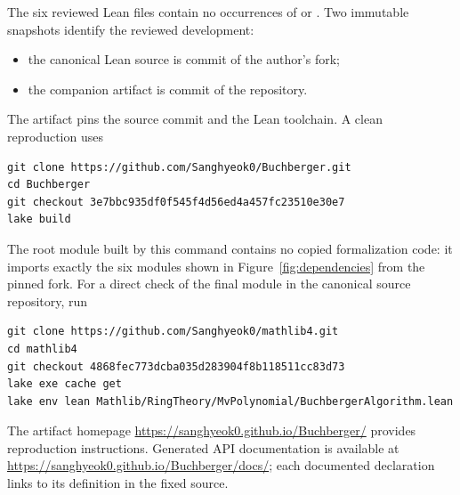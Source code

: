 The six reviewed Lean files contain no occurrences of  or
.  Two immutable snapshots identify the reviewed development:
\begin{itemize}[leftmargin=2em]
  \item the canonical Lean source is commit
    \href{https://github.com/Sanghyeok0/mathlib4/tree/4868fec773dcba035d283904f8b118511cc83d73}
    {}
    of the author's  fork;
  \item the companion artifact is commit
    \href{https://github.com/Sanghyeok0/Buchberger/commit/3e7bbc935df0f545f4d56ed4a457fc23510e30e7}
    {}
    of the  repository.
\end{itemize}
The artifact pins the source commit and the Lean
 toolchain.  A clean reproduction uses
\begin{verbatim}
git clone https://github.com/Sanghyeok0/Buchberger.git
cd Buchberger
git checkout 3e7bbc935df0f545f4d56ed4a457fc23510e30e7
lake build
\end{verbatim}
The root module built by this command contains no copied formalization
code: it imports exactly the six modules shown in
Figure~\ref{fig:dependencies} from the pinned fork.  For a direct check of the
final module in the canonical source repository, run
\begin{verbatim}
git clone https://github.com/Sanghyeok0/mathlib4.git
cd mathlib4
git checkout 4868fec773dcba035d283904f8b118511cc83d73
lake exe cache get
lake env lean Mathlib/RingTheory/MvPolynomial/BuchbergerAlgorithm.lean
\end{verbatim}
The artifact homepage
\url{https://sanghyeok0.github.io/Buchberger/} provides reproduction
instructions.  Generated API documentation is available at
\url{https://sanghyeok0.github.io/Buchberger/docs/}; each documented
declaration links to its definition in the fixed  source.

